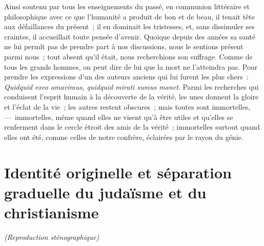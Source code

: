 \documentclass[french,twoside]{book} %
\begin{document}
Ainsi soutenu par tous les enseignements du passé, en communion littéraire et philosophique avec ce que l’humanité a produit de bon et de beau, il tenait tête aux défaillances du présent ; il en dominait les tristesses, et, sans dissimuler ses craintes, il accueillait toute pensée d’avenir. Quoique depuis des années sa santé ne lui permît pas de prendre part à nos discussions, nous le sentions présent parmi nous ; tout absent qu’il était, nous recherchions son suffrage. Comme de tous les grands hommes, on peut dire de lui que la mort ne l’atteindra pas. Pour prendre les expressions d’un des auteurs anciens qui lui furent les plus chers : \emph{Quidquid exeo amavimus, quidquid mirati sumus manet}. Parmi les recherches qui conduisent l’esprit humain à la découverte de la vérité, les unes donnent la gloire et l’éclat de la vie ; les autres restent obscures ; mais toutes sont immortelles, — immortelles, même quand elles ne visent qu’à être utiles et qu’elles se renferment dans le cercle étroit des amis de la vérité ; immortelles surtout quand elles ont été, comme celles de notre confrère, éclairées par le rayon du génie.
\section[{Identité originelle et séparation graduelle du judaïsme et du christianisme}]{Identité originelle et séparation graduelle du judaïsme et du christianisme}\renewcommand{\leftmark}{Identité originelle et séparation graduelle du judaïsme et du christianisme}

\begin{center}\emph{(Reproduction sténographique)}\end{center}
\end{document}
